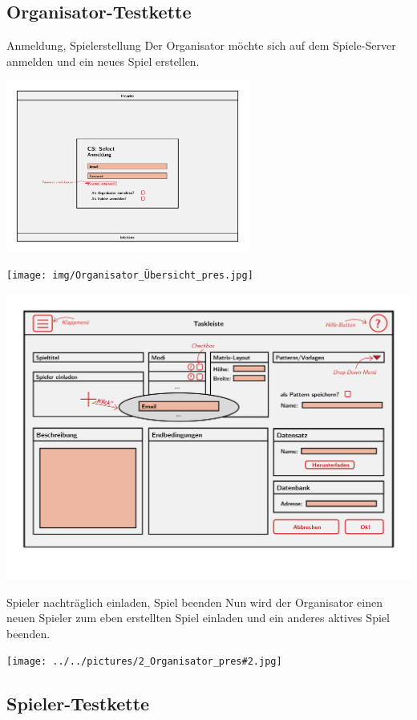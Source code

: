 \documentclass[xcolor=dvipsnames]{beamer}
\begin{document}
    \subsection{Organisator-Testkette}
    \begin{frame}
        \begin{block} {Anmeldung, Spielerstellung}
            Der Organisator möchte sich auf dem Spiele-Server anmelden und ein neues Spiel erstellen.
        \end{block}
        \includegraphics[width=8cm]{../../pictures/Anmeldung.jpg}
    \end{frame}
    \begin{frame}
        \texttt{[image: img/Organisator\_Übersicht\_pres.jpg]}
    \end{frame}
    \begin{frame}
         \includegraphics[width=\textwidth]{../../pictures/Spielerstellung.jpg}
    \end{frame}
    \begin{frame}
        \begin{block} {Spieler nachträglich einladen, Spiel beenden}
            Nun wird der Organisator einen neuen Spieler zum eben erstellten Spiel einladen und ein anderes aktives Spiel beenden.
        \end{block}
        \texttt{[image: ../../pictures/2\_Organisator\_pres\#2.jpg]}
    \end{frame}
    \subsection{Spieler-Testkette}
\end{document}
